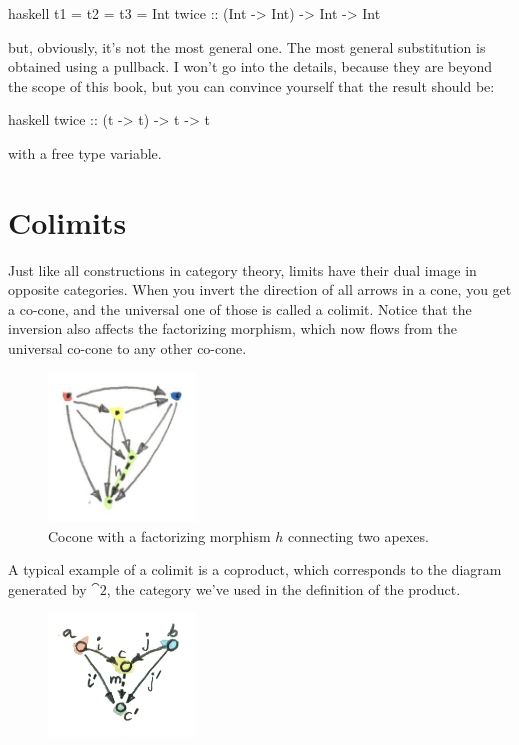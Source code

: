 \begin{snip}{haskell}
t1 = t2 = t3 = Int
twice :: (Int -> Int) -> Int -> Int
\end{snip}
but, obviously, it's not the most general one. The most general
substitution is obtained using a pullback. I won't go into the details,
because they are beyond the scope of this book, but you can convince
yourself that the result should be:

\begin{snip}{haskell}
twice :: (t -> t) -> t -> t
\end{snip}
with  a free type variable.

\section{Colimits}

Just like all constructions in category theory, limits have their dual
image in opposite categories. When you invert the direction of all
arrows in a cone, you get a co-cone, and the universal one of those is
called a colimit. Notice that the inversion also affects the factorizing
morphism, which now flows from the universal co-cone to any other
co-cone.

\begin{figure}[H]
\centering
\includegraphics[width=0.35\textwidth]{images/colimit.jpg}
\caption{Cocone with a factorizing morphism $h$ connecting two apexes.}
\end{figure}

\noindent
A typical example of a colimit is a coproduct, which corresponds to the
diagram generated by $\cat{2}$, the category we've used in the
definition of the product.

\begin{figure}[H]
\centering
\includegraphics[width=0.35\textwidth]{images/coproductranking.jpg}
\end{figure}

